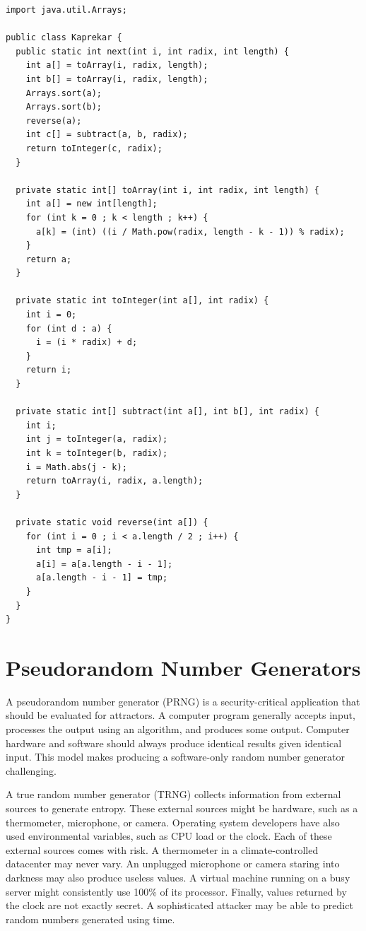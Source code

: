 \documentclass{book}
\begin{document}
\begin{lstlisting}[caption={A program to compute Kaprekar four-digit sequences},label={kaprekarCode}]
import java.util.Arrays;

public class Kaprekar {    
  public static int next(int i, int radix, int length) {
    int a[] = toArray(i, radix, length);
    int b[] = toArray(i, radix, length);
    Arrays.sort(a);
    Arrays.sort(b);
    reverse(a);
    int c[] = subtract(a, b, radix);
    return toInteger(c, radix);
  }

  private static int[] toArray(int i, int radix, int length) {
    int a[] = new int[length];
    for (int k = 0 ; k < length ; k++) {
      a[k] = (int) ((i / Math.pow(radix, length - k - 1)) % radix);
    }
    return a;
  }

  private static int toInteger(int a[], int radix) {
    int i = 0;
    for (int d : a) {
      i = (i * radix) + d;
    }
    return i;
  }

  private static int[] subtract(int a[], int b[], int radix) {
    int i;
    int j = toInteger(a, radix);
    int k = toInteger(b, radix);
    i = Math.abs(j - k);
    return toArray(i, radix, a.length);
  }

  private static void reverse(int a[]) {
    for (int i = 0 ; i < a.length / 2 ; i++) {
      int tmp = a[i];
      a[i] = a[a.length - i - 1];
      a[a.length - i - 1] = tmp;
    }
  }
}
\end{lstlisting}

\section{Pseudorandom Number Generators}

A pseudorandom number generator (PRNG) is a security-critical application that should be evaluated for attractors. A computer program generally accepts input, processes the output using an algorithm, and produces some output. Computer hardware and software should always produce identical results given identical input. This model makes producing a software-only random number generator challenging.

A true random number generator (TRNG) collects information from external sources to generate entropy. These external sources might be hardware, such as a thermometer, microphone, or camera. Operating system developers have also used environmental variables, such as CPU load or the clock. Each of these external sources comes with risk. A thermometer in a climate-controlled datacenter may never vary. An unplugged microphone or camera staring into darkness may also produce useless values. A virtual machine running on a busy server might consistently use 100\% of its processor. Finally, values returned by the clock are not exactly secret. A sophisticated attacker may be able to predict random numbers generated using time.
\end{document}
